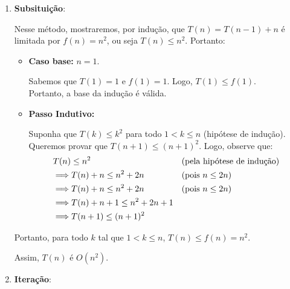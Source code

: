 \begin{enumerate}
	\item \textbf{Subsituição}:

	      \vspace{0.4em}
	      Nesse método, mostraremos, por indução, que \( T(n) = T(n-1) + n \) é limitada por \( f(n) = n^2 \), ou seja $T(n) \leq n^2$. Portanto:
	      \begin{itemize}
		      \item \textbf{Caso base:} \( n = 1 \).
		            \begin{adjustwidth}{1em}{}
			            Sabemos que \( T(1) = 1 \) e \( f(1) = 1 \). Logo, \( T(1) \leq f(1) \). \\
			            Portanto, a base da indução é válida.
		            \end{adjustwidth}

		      \item \textbf{Passo Indutivo:}
		            \begin{adjustwidth}{1em}{}
			            Suponha que \( T(k) \leq k^2 \) para todo \( 1 < k \leq n \) (hipótese de indução). \\
			            Queremos provar que \( T(n+1) \leq (n+1)^2 \). Logo, observe que:
			            \begin{align*}
				             & T(n) \leq n^2                                  &  & \text{(pela hipótese de indução)} \\
				             & \Longrightarrow T(n) + n \leq n^2 + 2n         &  & \text{(pois \( n \leq 2n \))}     \\
				             & \Longrightarrow T(n) + n \leq n^2 + 2n         &  & \text{(pois \( n \leq 2n \))}     \\
				             & \Longrightarrow T(n) + n + 1 \leq n^2 + 2n + 1                                        \\
				             & \Longrightarrow T(n+1) \leq (n+1)^2
			            \end{align*}
		            \end{adjustwidth}
	      \end{itemize}
	      Portanto, para todo \( k \) tal que \( 1 < k \leq n \), \( T(n) \leq f(n) = n^2 \).

	      Assim, \( T(n) \) é \( O(n^2) \).
	\item \textbf{Iteração}:


\end{enumerate}
